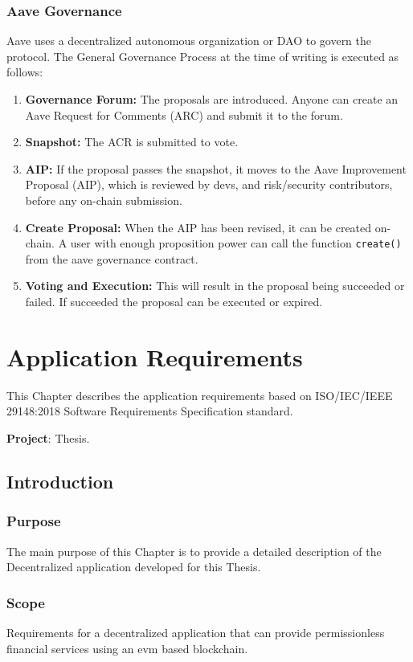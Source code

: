 \documentclass[11pt,a4paper]{report}
\begin{document}
\subsection{Aave Governance}\label{governance}
Aave\cite{aaveV1GOV} uses a decentralized autonomous organization or DAO\cite{wiki:Dao} to govern the protocol. The General Governance Process\cite{gov} at the time of writing is executed as follows:
\begin{enumerate}
	\item \textbf{Governance Forum\cite{govForum}:} The proposals are introduced. Anyone can create an Aave Request for Comments (ARC)\cite{arc} and submit it to the forum.
	\item \textbf{Snapshot\cite{snapshot}:} The ACR is submitted to vote.
	\item \textbf{AIP:} If the proposal passes the snapshot, it moves to the Aave Improvement Proposal (AIP), which is reviewed by devs, and risk/security contributors, before any on-chain submission.
	\item \textbf{Create Proposal:} When the AIP has been revised, it can be created on-chain. A user with enough proposition power can call the function \verb|create()|\cite{create} from the aave governance contract.
	\item \textbf{Voting and Execution:} This will result in the proposal being succeeded or failed. If succeeded the proposal can be executed or expired.
\end{enumerate}

\chapter{Application Requirements} \label{ch:appreq}
This Chapter describes the application requirements based on ISO/IEC/IEEE 29148:2018\cite{iso} Software Requirements Specification standard.

\textbf{Project}: Thesis.
\section{Introduction}
\subsection{Purpose}
The main purpose of this Chapter is to provide a detailed description of the Decentralized application developed for this Thesis. 
\subsection{Scope}
Requirements for a decentralized application that can provide
permissionless financial services using an evm based blockchain.
\end{document}
